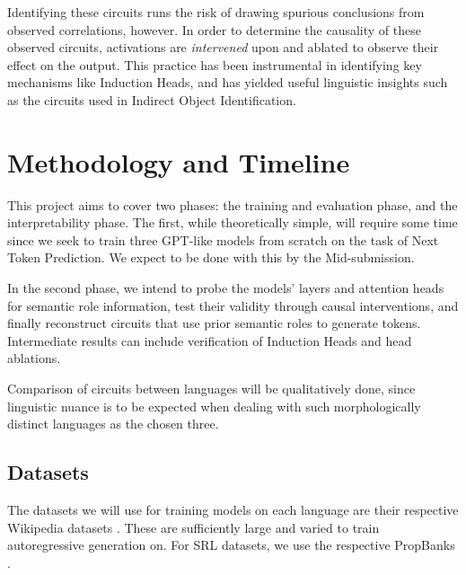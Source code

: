 \documentclass[11pt]{article}
\begin{document}
Identifying these circuits runs the risk of drawing spurious conclusions from observed correlations, however. In order to determine the causality of these observed circuits, activations are \emph{intervened} upon and ablated to observe their effect on the output. This practice has been instrumental in identifying key mechanisms like Induction Heads, and has yielded useful linguistic insights such as the circuits used in Indirect Object Identification.
\section{Methodology and Timeline}
\label{sec:orgac66b88}

This project aims to cover two phases: the training and evaluation phase, and the interpretability phase. The first, while theoretically simple, will require some time since we seek to train three GPT-like \citep{Radford2019LanguageMA} models from scratch on the task of Next Token Prediction. We expect to be done with this by the Mid-submission.

In the second phase, we intend to probe the models' layers and attention heads for semantic role information, test their validity through causal interventions, and finally reconstruct circuits that use prior semantic roles to generate tokens. Intermediate results can include verification of Induction Heads and head ablations.

Comparison of circuits between languages will be qualitatively done, since linguistic nuance is to be expected when dealing with such morphologically distinct languages as the chosen three.
\subsection{Datasets}
\label{sec:org2683df3}

The datasets we will use for training models on each language are their respective Wikipedia datasets \citep{wikidump}. These are sufficiently large and varied to train autoregressive generation on. For SRL datasets, we use the respective PropBanks \citep{10.1162/0891201053630264,Bhat2017,jindal-EtAl:2022:LREC,akbik-etal-2015-generating}.




\end{document}

